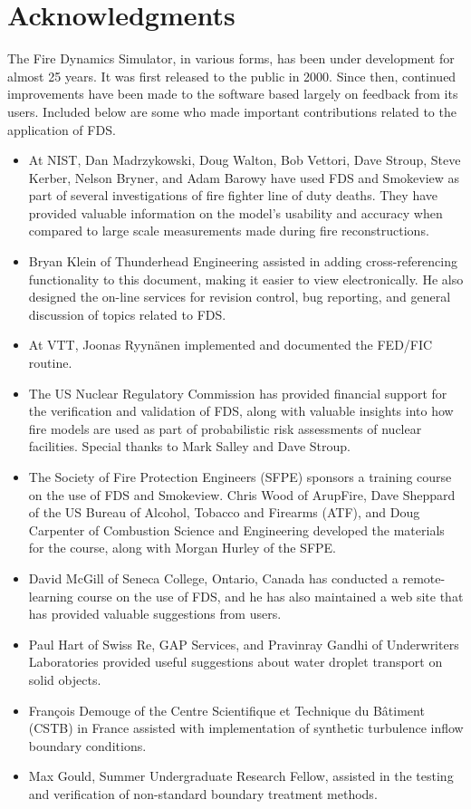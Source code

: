 \documentclass[11pt]{book}
\begin{document}



\chapter{Acknowledgments}

The Fire Dynamics Simulator, in various forms, has been under development for almost 25 years. It was first released to the public in 2000. Since then, continued improvements have been made to the software based largely on feedback from its users. Included below are some who made important contributions related to the application of FDS.
\begin{itemize}
\item At NIST, Dan Madrzykowski, Doug Walton, Bob Vettori, Dave Stroup, Steve Kerber, Nelson Bryner, and Adam Barowy have used FDS and Smokeview as part of several investigations of fire fighter line of duty deaths. They have provided valuable information on the model's usability and accuracy when compared to large scale measurements made during fire reconstructions.
\item Bryan Klein of Thunderhead Engineering assisted in adding cross-referencing functionality to this document, making it easier to view electronically. He also designed the on-line services for revision control, bug reporting, and general discussion of topics related to FDS.
\item At VTT, Joonas Ryyn\"{a}nen implemented and documented the FED/FIC routine.
\item The US Nuclear Regulatory Commission has provided financial support for the verification and validation of FDS, along with valuable insights into how fire models are used as part of probabilistic risk assessments of nuclear facilities. Special thanks to Mark Salley and Dave Stroup.
\item The Society of Fire Protection Engineers (SFPE) sponsors a training course on the use of FDS and Smokeview. Chris Wood of ArupFire, Dave Sheppard of the US Bureau of Alcohol, Tobacco and Firearms (ATF), and Doug Carpenter of Combustion Science and Engineering developed the materials for the course, along with Morgan Hurley of the SFPE.
\item David McGill of Seneca College, Ontario, Canada has conducted a remote-learning course on the use of FDS, and he has also maintained a web site that has provided valuable suggestions from users.
\item Paul Hart of Swiss Re, GAP Services, and Pravinray Gandhi of Underwriters Laboratories provided useful suggestions about water droplet transport on solid objects.
\item Fran\c{c}ois Demouge of the Centre Scientifique et Technique du B\^{a}timent (CSTB) in France assisted with implementation of synthetic turbulence inflow boundary conditions.
\item Max Gould, Summer Undergraduate Research Fellow, assisted in the testing and verification of non-standard boundary treatment methods.
\end{itemize}
\end{document}
